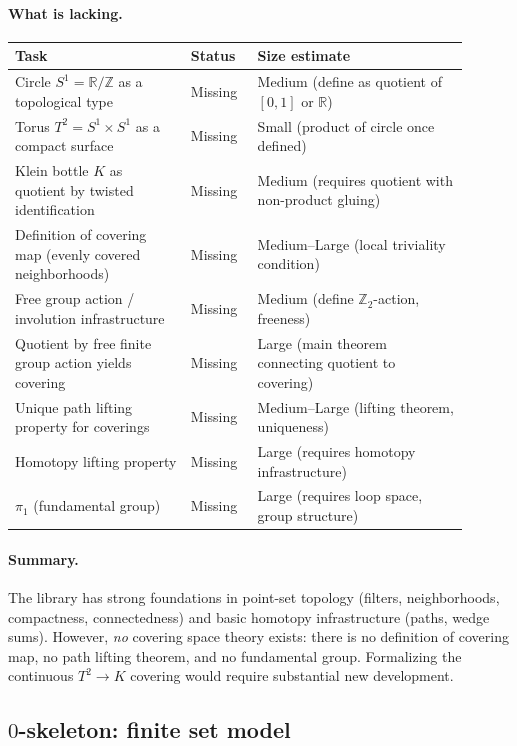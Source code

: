 \documentclass[11pt,a4paper]{article}
\theoremstyle{definition}
\theoremstyle{remark}
\begin{document}
\paragraph{What is lacking.}
\begin{center}
\begin{tabular}{p{0.35\linewidth} p{0.13\linewidth} p{0.42\linewidth}}
\hline
\textbf{Task} & \textbf{Status} & \textbf{Size estimate}\\
\hline
Circle \(S^1=\mathbb{R}/\mathbb{Z}\) as a topological type & Missing & Medium (define as quotient of \([0,1]\) or \(\mathbb{R}\))\\
Torus \(T^2=S^1\times S^1\) as a compact surface & Missing & Small (product of circle once defined)\\
Klein bottle \(K\) as quotient by twisted identification & Missing & Medium (requires quotient with non-product gluing)\\
Definition of covering map (evenly covered neighborhoods) & Missing & Medium--Large (local triviality condition)\\
Free group action / involution infrastructure & Missing & Medium (define \(\mathbb{Z}_2\)-action, freeness)\\
Quotient by free finite group action yields covering & Missing & Large (main theorem connecting quotient to covering)\\
Unique path lifting property for coverings & Missing & Medium--Large (lifting theorem, uniqueness)\\
Homotopy lifting property & Missing & Large (requires homotopy infrastructure)\\
\(\pi_1\) (fundamental group) & Missing & Large (requires loop space, group structure)\\
\hline
\end{tabular}
\end{center}

\paragraph{Summary.}
The library has strong foundations in point-set topology (filters, neighborhoods, compactness, connectedness) and basic homotopy infrastructure (paths, wedge sums). However, \emph{no} covering space theory exists: there is no definition of covering map, no path lifting theorem, and no fundamental group. Formalizing the continuous \(T^2\to K\) covering would require substantial new development.

\subsection{\(0\)-skeleton: finite set model}
\label{app:0-skeleton}
\end{document}
